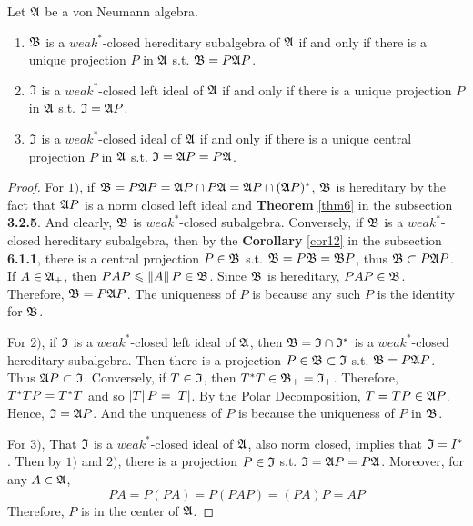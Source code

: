 \begin{thm}
	Let $\mathfrak{A}$ be a von Neumann algebra.
	\begin{enumerate}[label=\arabic*)]
		\item $\mathfrak{B}$ is a $weak^*$-closed hereditary subalgebra of $\mathfrak{A}$ if and only if there is a unique projection $P$ in $\mathfrak{A}$ s.t. $\mathfrak{B} = P \mathfrak{A} P$.
		\item $\mathfrak{I}$ is a $weak^*$-closed left ideal of $\mathfrak{A}$ if and only if there is a unique projection $P$ in $\mathfrak{A}$ s.t. $\mathfrak{I} = \mathfrak{A} P$.
		\item $\mathfrak{I}$ is a $weak^*$-closed ideal of $\mathfrak{A}$ if and only if there is a unique central projection $P$ in $\mathfrak{A}$ s.t. $\mathfrak{I} = \mathfrak{A} P = P \mathfrak{A}$.
	\end{enumerate}
\end{thm}
\begin{proof}
	For $1)$, if $\mathfrak{B} = P \mathfrak{A} P = \mathfrak{A} P \cap P \mathfrak{A} = \mathfrak{A} P \cap (\mathfrak{A} P)^{*}$, $\mathfrak{B}$ is hereditary by the fact that $\mathfrak{A} P$ is a norm closed left ideal and \textbf{Theorem} \ref{thm6} in the subsection \textbf{3.2.5}. And clearly, $\mathfrak{B}$ is $weak^*$-closed subalgebra. Conversely, if $\mathfrak{B}$ is a $weak^*$-closed hereditary subalgebra, then by the \textbf{Corollary} \ref{cor12} in the subsection \textbf{6.1.1}, there is a central projection $P \in \mathfrak{B}$ s.t. $\mathfrak{B} = P \mathfrak{B} = \mathfrak{B} P$, thus $\mathfrak{B} \subset P \mathfrak{A} P$. If $A \in \mathfrak{A}_+$, then $PAP  \leqslant \left\lVert A\right\lVert P \in \mathfrak{B}$. Since $\mathfrak{B}$ is hereditary, $PAP \in \mathfrak{B}$. Therefore, $\mathfrak{B} =  P \mathfrak{A} P$. The uniqueness of $P$ is because any such $P$ is the identity for $\mathfrak{B}$.
	\item For $2)$, if $\mathfrak{I}$ is a $weak^*$-closed left ideal of $\mathfrak{A}$, then $\mathfrak{B} = \mathfrak{I} \cap \mathfrak{I}^{*}$ is a $weak^*$-closed hereditary subalgebra. Then there is a projection $P \in \mathfrak{B} \subset \mathfrak{I}$ s.t. $\mathfrak{B} =  P \mathfrak{A} P$. Thus $\mathfrak{A} P \subset \mathfrak{I}$. Conversely, if $T \in \mathfrak{I}$, then $T^{*}T \in \mathfrak{B}_+ = \mathfrak{I}_+$. Therefore, $T^{*}T P = T^{*}T$ and so $\left\lvert T\right\lvert P = \left\lvert T\right\lvert$. By the Polar Decomposition, $T = TP \in \mathfrak{A} P$. Hence, $\mathfrak{I} = \mathfrak{A} P$. And the unqueness of $P$ is because the uniqueness of $P$ in $\mathfrak{B}$.
	\item For $3)$, That $\mathfrak{I}$ is a $weak^*$-closed ideal of $\mathfrak{A}$, also norm closed, implies that $\mathfrak{I} = I^{*}$. Then by $1)$ and $2)$, there is a projection $P \in \mathfrak{I}$ s.t. $\mathfrak{I} = \mathfrak{A} P = P \mathfrak{A}$. Moreover, for any $A \in \mathfrak{A}$,
	\begin{equation*}
		PA = P(PA) = P (PAP) = (PA) P = AP
	\end{equation*}
	Therefore, $P$ is in the center of $\mathfrak{A}$.
\end{proof}

